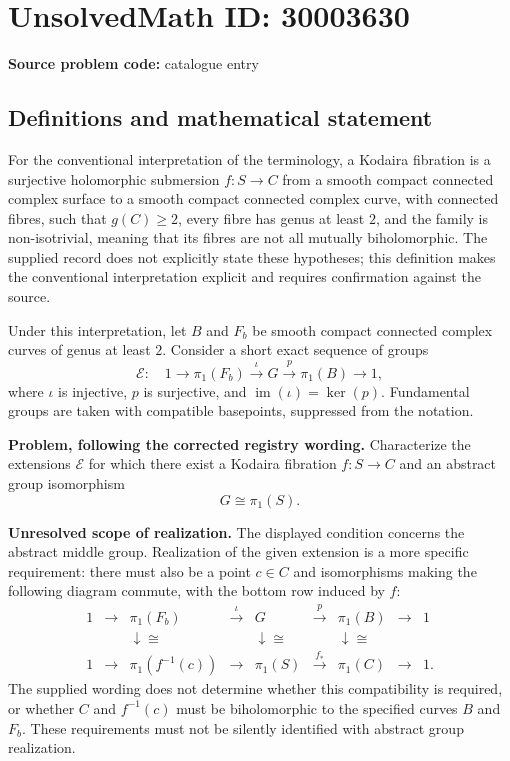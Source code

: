 \documentclass[11pt]{article}
\begin{document}
\section*{UnsolvedMath ID: 30003630}
\textbf{Source problem code:} catalogue entry
\subsection{Definitions and mathematical statement}
For the conventional interpretation of the terminology, a Kodaira fibration is a surjective holomorphic submersion \(f\colon S\to C\) from a smooth compact connected complex surface to a smooth compact connected complex curve, with connected fibres, such that \(g(C)\geq 2\), every fibre has genus at least \(2\), and the family is non-isotrivial, meaning that its fibres are not all mutually biholomorphic. The supplied record does not explicitly state these hypotheses; this definition makes the conventional interpretation explicit and requires confirmation against the source.

Under this interpretation, let \(B\) and \(F_b\) be smooth compact connected complex curves of genus at least \(2\). Consider a short exact sequence of groups
\[
\mathcal E\colon\quad 1\longrightarrow\pi_1(F_b)\xrightarrow{\iota}G\xrightarrow{p}\pi_1(B)\longrightarrow1,
\]
where \(\iota\) is injective, \(p\) is surjective, and \(\operatorname{im}(\iota)=\ker(p)\). Fundamental groups are taken with compatible basepoints, suppressed from the notation.

\textbf{Problem, following the corrected registry wording.} Characterize the extensions \(\mathcal E\) for which there exist a Kodaira fibration \(f\colon S\to C\) and an abstract group isomorphism
\[
G\cong\pi_1(S).
\]

\textbf{Unresolved scope of realization.} The displayed condition concerns the abstract middle group. Realization of the given extension is a more specific requirement: there must also be a point \(c\in C\) and isomorphisms making the following diagram commute, with the bottom row induced by \(f\):
\[
\begin{array}{ccccccccc}
1&\longrightarrow&\pi_1(F_b)&\xrightarrow{\iota}&G&\xrightarrow{p}&\pi_1(B)&\longrightarrow&1\\
&&\downarrow\scriptstyle\cong&&\downarrow\scriptstyle\cong&&\downarrow\scriptstyle\cong&&\\
1&\longrightarrow&\pi_1(f^{-1}(c))&\longrightarrow&\pi_1(S)&\xrightarrow{f_*}&\pi_1(C)&\longrightarrow&1.
\end{array}
\]
The supplied wording does not determine whether this compatibility is required, or whether \(C\) and \(f^{-1}(c)\) must be biholomorphic to the specified curves \(B\) and \(F_b\). These requirements must not be silently identified with abstract group realization.
\end{document}
